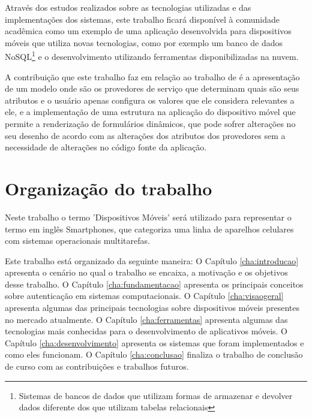 Através dos estudos realizados sobre as tecnologias utilizadas e das implementações dos sistemas, este trabalho ficará disponível à comunidade acadêmica como um exemplo de uma aplicação desenvolvida para dispositivos móveis que utiliza novas tecnologias, como por exemplo um banco de dados NoSQL\footnote{Sistemas de bancos de dados que utilizam formas de armazenar e devolver dados diferente dos que utilizam tabelas relacionais} e o desenvolvimento utilizando ferramentas disponibilizadas na nuvem.

A contribuição que este trabalho faz em relação ao trabalho de \cite{praca12} é a apresentação de um modelo onde são os provedores de serviço que determinam quais são seus atributos e o usuário apenas configura os valores que ele considera relevantes a ele, e a implementação de uma estrutura na aplicação do dispositivo móvel que permite a renderização de formulários dinâmicos, que pode sofrer alterações no seu desenho de acordo com as alterações dos atributos dos provedores sem a necessidade de alterações no código fonte da aplicação.

\section{Organização do trabalho}
Neste trabalho o termo 'Dispositivos Móveis' será utilizado para representar o termo em inglês Smartphones, que categoriza uma linha de aparelhos celulares com sistemas operacionais multitarefas.

Este trabalho está organizado da seguinte maneira: O Capítulo \ref{cha:introducao} apresenta o cenário no qual o trabalho se encaixa, a motivação e os objetivos desse trabalho. O Capítulo \ref{cha:fundamentacao} apresenta os principais conceitos sobre autenticação em sistemas computacionais. O Capítulo \ref{cha:visaogeral} apresenta algumas das principais tecnologias sobre dispositivos móveis presentes no mercado atualmente. O Capítulo \ref{cha:ferramentas} apresenta algumas das tecnologias mais conhecidas para o desenvolvimento de aplicativos móveis. O Capítulo \ref{cha:desenvolvimento} apresenta os sistemas que foram implementados e como eles funcionam. O Capítulo \ref{cha:conclusao} finaliza o trabalho de conclusão de curso com as contribuições e trabalhos futuros.